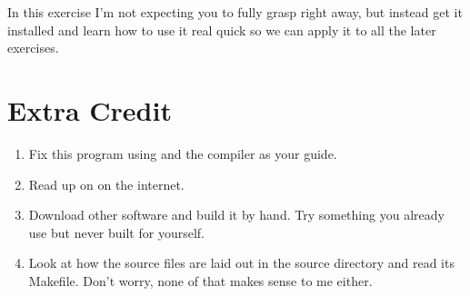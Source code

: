In this exercise I'm not expecting you to fully grasp  right
away, but instead get it installed and learn how to use it real quick so we
can apply it to all the later exercises.

\section{Extra Credit}

\begin{enumerate}
\item Fix this program using  and the compiler as your guide.
\item Read up on  on the internet.
\item Download other software and build it by hand. Try something you already
    use but never built for yourself.
\item Look at how the  source files are laid out in the
    source directory and read its Makefile.  Don't worry, none of that
    makes sense to me either.
\end{enumerate}

